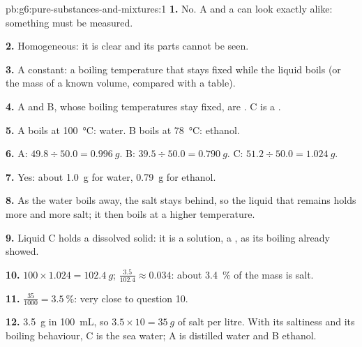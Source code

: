 \begin{solution}{pb:g6:pure-substances-and-mixtures:1}
\textbf{1.} No. A  and a  can look
exactly alike: something must be measured.

\textbf{2.} Homogeneous: it is clear and its parts cannot be seen.

\textbf{3.} A constant: a boiling temperature that stays fixed while the
liquid boils (or the mass of a known volume, compared with a table).

\textbf{4.} A and B, whose boiling temperatures stay fixed, are . C is a .

\textbf{5.} A boils at \qty{100}{\celsius}: water. B boils at
\qty{78}{\celsius}: ethanol.

\textbf{6.} A: $49.8 \div 50.0 = \qty{0.996}{g}$. B: $39.5 \div 50.0 =
\qty{0.790}{g}$. C: $51.2 \div 50.0 = \qty{1.024}{g}$.

\textbf{7.} Yes: about \qty{1.0}{g} for water, \qty{0.79}{g} for
ethanol.

\textbf{8.} As the water boils away, the salt stays behind, so the
liquid that remains holds more and more salt; it then boils at a higher
temperature.

\textbf{9.} Liquid C holds a dissolved solid: it is a solution, a
, as its boiling already showed.

\textbf{10.} $100 \times 1.024 = \qty{102.4}{g}$; $\frac{3.5}{102.4}
\approx 0.034$: about \qty{3.4}{\percent} of the mass is salt.

\textbf{11.} $\frac{35}{1000} = \qty{3.5}{\percent}$: very close to
question 10.

\textbf{12.} \qty{3.5}{g} in \qty{100}{mL}, so $3.5 \times 10 =
\qty{35}{g}$ of salt per litre. With its saltiness and its boiling
behaviour, C is the sea water; A is distilled water and B ethanol.
\end{solution}
